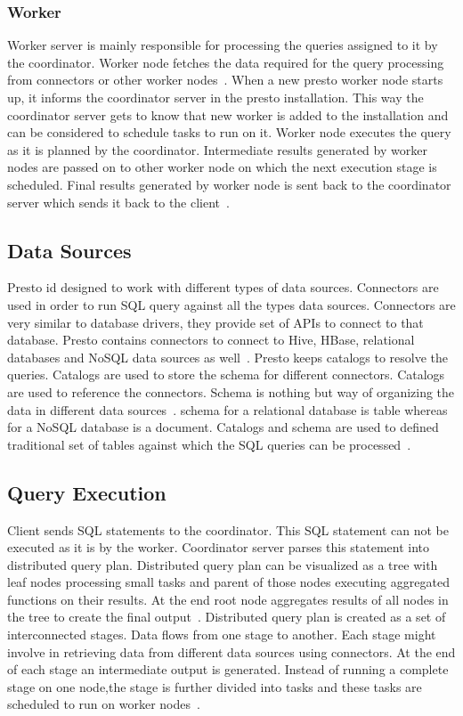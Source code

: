 \subsubsection{Worker}
Worker server is mainly responsible for processing the queries assigned to it
by the coordinator. Worker node fetches the data required for the query
processing from connectors or other worker
nodes~\cite{hid-sp18-502-prestodb-concept}. When a new presto worker node
starts up, it informs the coordinator server in the presto installation. This
way the coordinator server gets to know that new worker is added to the
installation and can be considered to schedule tasks to run on it.
Worker node executes the query as it is planned by the coordinator. Intermediate
results generated by worker nodes are passed on to other worker node on which
the next execution stage is scheduled. Final results generated by worker node is
sent back to the coordinator server which sends it back to
the client~\cite{hid-sp18-502-prestodb-concept}.

\subsection{Data Sources}
Presto id designed to work with different types of data sources. Connectors are
used in order to run SQL query against all the types data sources. Connectors
are very similar to database drivers, they provide set of APIs to connect to
that database. Presto contains connectors to connect to Hive, HBase, relational
databases and NoSQL data sources as well~\cite{hid-sp18-502-prestodb-concept}.
Presto keeps catalogs to resolve the queries. Catalogs are used to store the
schema for different connectors. Catalogs are used to reference the connectors.
Schema is nothing but way of organizing the data in different data
sources~\cite{hid-sp18-502-prestodb-concept}. schema for a relational database
is table whereas for a NoSQL database is a document. Catalogs and schema are
used to defined traditional set of tables against which the SQL queries can be
processed~\cite{hid-sp18-502-prestodb-concept}.

\subsection{Query Execution}
Client sends SQL statements to the coordinator. This SQL statement can not be
executed as it is by the worker. Coordinator server parses this statement into
distributed query plan. Distributed query plan can be visualized as a tree with
leaf nodes processing small tasks and parent of those nodes executing aggregated
functions on their results. At the end root node aggregates results of all
nodes in the tree to create the final
output~\cite{hid-sp18-502-prestodb-concept}.
Distributed query plan is created as a set of interconnected stages. Data flows
from one stage to another. Each stage might involve in retrieving data from
different data sources using connectors. At the end of each stage an
intermediate output is generated. Instead of running a complete stage on one
node,the stage is further divided into tasks and these tasks are scheduled to
run on worker nodes~\cite{hid-sp18-502-prestodb-concept}.

